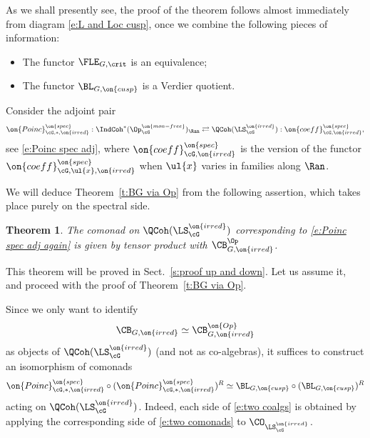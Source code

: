 \documentclass[9pt]{amsart}
\newtheorem{thm}[subsubsection]{Theorem}
\theoremstyle{remark}
\theoremstyle{definition}
\theoremstyle{remark}
\newcommand{\thmref}[1]{Theorem~\ref{#1}}
\newcommand{\secref}[1]{Sect.~\ref{#1}}
\numberwithin{equation}{section}
\begin{document}
\ssec{Proof of \thmref{t:BG via Op}}

As we shall presently see, the proof of the theorem follows almost immediately from diagram \eqref{e:L and Loc cusp},
once we combine the following pieces of information:

\begin{itemize}

\item The functor $\FLE_{G,\crit}$ is an equivalence;

\item The functor $\BL_{G,\on{cusp}}$ is a Verdier quotient.

\end{itemize}

\sssec{}

Consider the adjoint pair
\begin{equation} \label{e:Poinc spec adj again}
\on{Poinc}^{\on{spec}}_{\cG,*,\on{irred}}:
\IndCoh^*(\Op^{\on{mon-free}}_\cG)_\Ran  \rightleftarrows \QCoh(\LS^{\on{irred}}_\cG):
\on{coeff}^{\on{spec}}_{\cG,\on{irred}},
\end{equation}
see \eqref{e:Poinc spec adj}, where $\on{coeff}^{\on{spec}}_{\cG,\on{irred}}$ is the version of the functor
$\on{coeff}^{\on{spec}}_{\cG,\ul{x},\on{irred}}$ when $\ul{x}$ varies in families along $\Ran$. 
 
\sssec{}

We will deduce \thmref{t:BG via Op} from the following assertion, which takes place
purely on the spectral side.

\medskip

\begin{thm} \label{t:up and down opers}
The comonad on $\QCoh(\LS^{\on{irred}}_\cG)$ corresponding to \eqref{e:Poinc spec adj again}
is given by tensor product with $\CB^{\Op}_{G,\on{irred}}$.
\end{thm}

This theorem will be proved in \secref{s:proof up and down}. Let us assume it, and proceed with the proof
of \thmref{t:BG via Op}.

\sssec{}

Since we only want to identify 
\begin{equation} \label{e:two coalgs}
\CB_{G,\on{irred}}\simeq \CB^{\on{Op}}_{G,\on{irred}}
\end{equation}
as objects of $\QCoh(\LS^{\on{irred}}_\cG)$ 
(and not as co-algebras), it suffices to construct an isomorphism of comonads
\begin{equation} \label{e:two comonads}
\on{Poinc}^{\on{spec}}_{\cG,*,\on{irred}} \circ (\on{Poinc}^{\on{spec}}_{\cG,*,\on{irred}})^R \simeq
\BL_{G,\on{cusp}}\circ (\BL_{G,\on{cusp}})^R
\end{equation} 
acting on $\QCoh(\LS^{\on{irred}}_\cG)$.  Indeed, each side of \eqref{e:two coalgs} is obtained by applying
the corresponding side of \eqref{e:two comonads} to $\CO_{\LS^{\on{irred}}_\cG}$.
\end{document}
